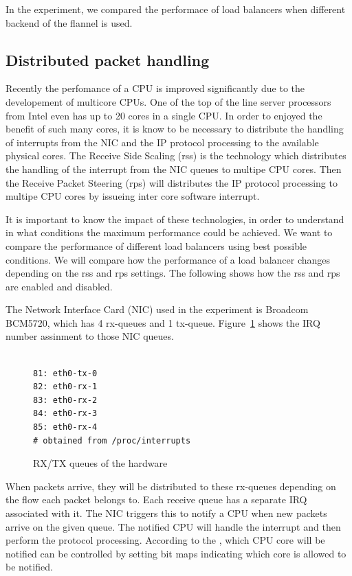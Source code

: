 In the experiment, we compared the performace of load balancers when different backend of the flannel is used. 


\subsection{Distributed packet handling}

Recently the perfomance of a CPU is improved significantly due to the developement of multicore CPUs.
One of the top of the line server processors from Intel even has up to 20 cores in a single CPU.
In order to enjoyed the benefit of such many cores, 
it is know to be necessary to distribute the handling of interrupts from the NIC and the IP protocol processing
to the available physical cores.
The Receive Side Scaling (rss)\cite{TomHerbert} is the technology 
which distributes the handling of the interrupt from the NIC queues to multipe CPU cores.
Then the Receive Packet Steering (rps)\cite{TomHerbert} will distributes the IP protocol processing 
to multipe CPU cores by issueing inter core software interrupt.

It is important to know the impact of these technologies, 
in order to understand in what conditions the maximum performance could be achieved.
We want to compare the performance of different load balancers using best possible conditions.
We will compare how the performance of a load balancer changes depending on the rss and rps settings.
The following shows how the rss and rps are enabled and disabled. 

The Network Interface Card (NIC) used in the experiment is Broadcom BCM5720, which has 4 rx-queues and 1 tx-queue.
Figure~\ref{fig:rx-queue} shows  the IRQ number assinment to those NIC queues.
 
\begin{figure}
\begin{minipage}{0.8\columnwidth}
\small
\begin{verbatim}

81: eth0-tx-0
82: eth0-rx-1
83: eth0-rx-2
84: eth0-rx-3
85: eth0-rx-4
# obtained from /proc/interrupts 

\end{verbatim}
\end{minipage}
\caption{RX/TX queues of the hardware}
\label{fig:rx-queue}
\end{figure}

When packets arrive, they will be distributed to these rx-queues depending on the flow each packet belongs to.
Each receive queue has a separate IRQ associated with it. The NIC triggers
this to notify a CPU when new packets arrive on the given queue.
The notified CPU will handle the interrupt and then perform the protocol processing. 
According to the \cite{TomHerbert}, which CPU core will be notified can be controlled by setting 
bit maps indicating which core is allowed to be notified.

